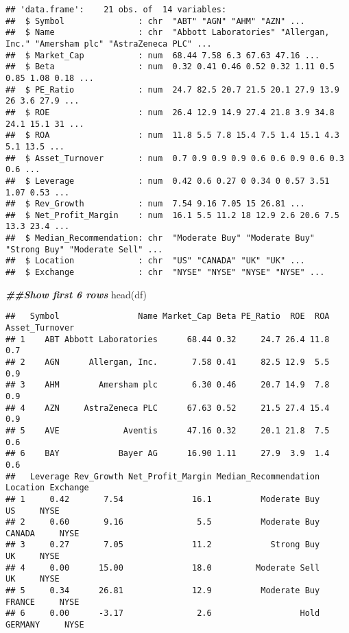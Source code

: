 \documentclass[
]{article}
\newenvironment{Shaded}{\begin{snugshade}}{\end{snugshade}}
\newcommand{\DocumentationTok}[1]{\textcolor[rgb]{0.56,0.35,0.01}{\textbf{\textit{#1}}}}
\newcommand{\FunctionTok}[1]{\textcolor[rgb]{0.00,0.00,0.00}{#1}}
\newcommand{\NormalTok}[1]{#1}
\begin{document}
\begin{verbatim}
## 'data.frame':    21 obs. of  14 variables:
##  $ Symbol               : chr  "ABT" "AGN" "AHM" "AZN" ...
##  $ Name                 : chr  "Abbott Laboratories" "Allergan, Inc." "Amersham plc" "AstraZeneca PLC" ...
##  $ Market_Cap           : num  68.44 7.58 6.3 67.63 47.16 ...
##  $ Beta                 : num  0.32 0.41 0.46 0.52 0.32 1.11 0.5 0.85 1.08 0.18 ...
##  $ PE_Ratio             : num  24.7 82.5 20.7 21.5 20.1 27.9 13.9 26 3.6 27.9 ...
##  $ ROE                  : num  26.4 12.9 14.9 27.4 21.8 3.9 34.8 24.1 15.1 31 ...
##  $ ROA                  : num  11.8 5.5 7.8 15.4 7.5 1.4 15.1 4.3 5.1 13.5 ...
##  $ Asset_Turnover       : num  0.7 0.9 0.9 0.9 0.6 0.6 0.9 0.6 0.3 0.6 ...
##  $ Leverage             : num  0.42 0.6 0.27 0 0.34 0 0.57 3.51 1.07 0.53 ...
##  $ Rev_Growth           : num  7.54 9.16 7.05 15 26.81 ...
##  $ Net_Profit_Margin    : num  16.1 5.5 11.2 18 12.9 2.6 20.6 7.5 13.3 23.4 ...
##  $ Median_Recommendation: chr  "Moderate Buy" "Moderate Buy" "Strong Buy" "Moderate Sell" ...
##  $ Location             : chr  "US" "CANADA" "UK" "UK" ...
##  $ Exchange             : chr  "NYSE" "NYSE" "NYSE" "NYSE" ...
\end{verbatim}

\begin{Shaded}
\begin{Highlighting}[]
\DocumentationTok{\#\#Show first 6 rows}
\FunctionTok{head}\NormalTok{(df)}
\end{Highlighting}
\end{Shaded}

\begin{verbatim}
##   Symbol                Name Market_Cap Beta PE_Ratio  ROE  ROA Asset_Turnover
## 1    ABT Abbott Laboratories      68.44 0.32     24.7 26.4 11.8            0.7
## 2    AGN      Allergan, Inc.       7.58 0.41     82.5 12.9  5.5            0.9
## 3    AHM        Amersham plc       6.30 0.46     20.7 14.9  7.8            0.9
## 4    AZN     AstraZeneca PLC      67.63 0.52     21.5 27.4 15.4            0.9
## 5    AVE             Aventis      47.16 0.32     20.1 21.8  7.5            0.6
## 6    BAY            Bayer AG      16.90 1.11     27.9  3.9  1.4            0.6
##   Leverage Rev_Growth Net_Profit_Margin Median_Recommendation Location Exchange
## 1     0.42       7.54              16.1          Moderate Buy       US     NYSE
## 2     0.60       9.16               5.5          Moderate Buy   CANADA     NYSE
## 3     0.27       7.05              11.2            Strong Buy       UK     NYSE
## 4     0.00      15.00              18.0         Moderate Sell       UK     NYSE
## 5     0.34      26.81              12.9          Moderate Buy   FRANCE     NYSE
## 6     0.00      -3.17               2.6                  Hold  GERMANY     NYSE
\end{verbatim}
\end{document}
